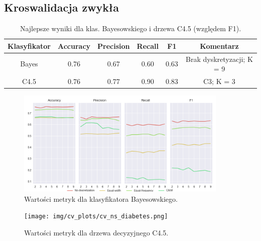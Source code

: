 \subsection*{Kroswalidacja zwykła}

\begin{table}[H]
  \center
  \begin{tabular}{|c|c|c|c|c|c|}
    \hline
    Klasyfikator & Accuracy & Precision & Recall & F1 & Komentarz \\ \hline
    Bayes        & 0.76     & 0.67      & 0.60   & 0.63 & Brak dyskretyzacji; K = 9 \\ \hline
    C4.5         & 0.76     & 0.77      & 0.90   & 0.83 & C3; K = 3 \\ \hline
  \end{tabular}

  \caption{Najlepsze wyniki dla klas. Bayesowskiego i drzewa C4.5 (względem F1).}
\end{table}

\begin{figure}[H]
    \center
    \includegraphics[width=0.9\textwidth]{img/cv_scores_kfold/scoring_kfold_diabetes.png}
    \caption{Wartości metryk dla klasyfikatora Bayesowskiego.}
\end{figure}

\begin{figure}[H]
    \center
    \texttt{[image: img/cv\_plots/cv\_ns\_diabetes.png]}
    \caption{Wartości metryk dla drzewa decyzyjnego C4.5.}
\end{figure}

